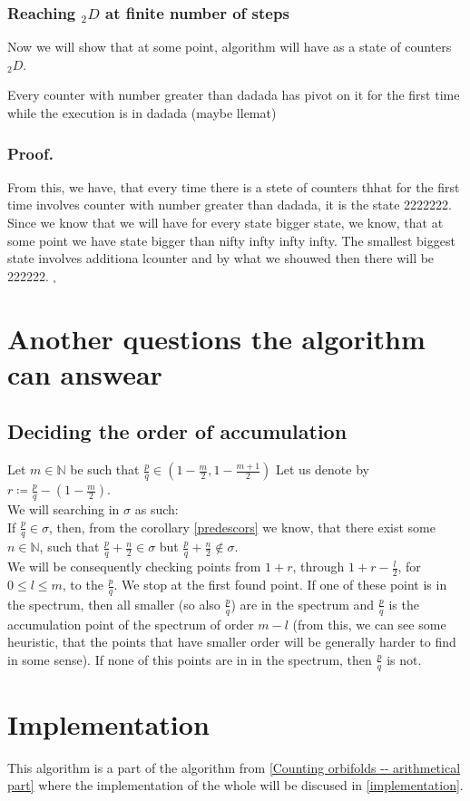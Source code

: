 \subsubsection{Reaching $_2D$ at finite number of steps}
Now we will show that at some point, algorithm will have as a state of counters $_2D$. 

\begin{lemma}
Every counter with number greater than dadada 
has pivot on it for the first time while the execution is in dadada (maybe llemat)
\end{lemma}
\subsubsection{Proof.}

From this, we have, that every time there is a stete of counters thhat for the first time 
involves counter with number greater than dadada, it is the state 2222222. 
Since we know that we will have for every state bigger state, we know, that at some point we have 
state bigger than nifty infty infty infty. The smallest biggest state involves additiona lcounter 
and by what we shouwed then there will be 222222. $_\square$





\section{Another questions the algorithm can answear}
\subsection{Deciding the order of accumulation}
Let $m \in \mathbb{N}$ be such that $\frac{p}{q} \in (1-\frac{m}{2},1-
\frac{m+1}{2})$
Let us denote by $r \coloneqq \frac{p}{q} - (1-\frac{m}{2})$. \\ 

We will searching in $\sigma$ as such: \\

If $\frac{p}{q} \in \sigma$, then, from the corollary \ref{predescors} we know, that there 
exist some $n \in \mathbb{N}$, such that $\frac{p}{q} + \frac{n}{2} \in \sigma$ but 
$\frac{p}{q} + \frac{n}{2} \not\in \sigma$. \\

We will be consequently checking points from $1+r$, through $1+r-\frac{l}{2}$, for 
$0 \leq l \leq m$, to the $\frac{p}{q}$. We stop at the first found point. 
If one of these point is in the spectrum, then all smaller (so also $\frac{p}{q}$) are in 
the spectrum and $\frac{p}{q}$ is the accumulation point of the spectrum of order $m-l$ 
(from this, 
we can see some heuristic, that the points that have smaller order will be generally 
harder to find in some sense). If none of this points are in in the spectrum, then $\frac{p}{q}$ 
is not. \\

\section{Implementation}
This algorithm is a part of the algorithm from \ref{Counting orbifolds -- arithmetical part} 
where the implementation of the whole will be discused in \ref{implementation}.
